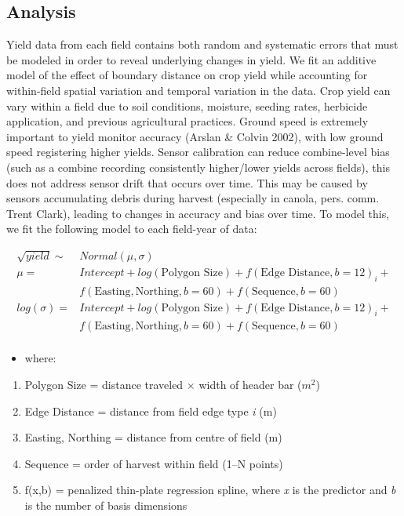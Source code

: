 \documentclass[]{elsarticle} %
\providecommand{\tightlist}{%
  \setlength{\itemsep}{0pt}\setlength{\parskip}{0pt}}
\begin{document}
\hypertarget{analysis}{%
\subsection{Analysis}\label{analysis}}

Yield data from each field contains both random and systematic errors that must be modeled in order to reveal underlying changes in yield.
We fit an additive model of the effect of boundary distance on crop yield while accounting for within-field spatial variation and temporal variation in the data.
Crop yield can vary within a field due to soil conditions, moisture, seeding rates, herbicide application, and previous agricultural practices.
Ground speed is extremely important to yield monitor accuracy (Arslan \& Colvin 2002), with low ground speed registering higher yields.
Sensor calibration can reduce combine-level bias (such as a combine recording consistently higher/lower yields across fields), this does not address sensor drift that occurs over time.
This may be caused by sensors accumulating debris during harvest (especially in canola, pers. comm. Trent Clark), leading to changes in accuracy and bias over time.
To model this, we fit the following model to each field-year of data:

\begin{equation}
  \begin{split}
  \sqrt{yield} \sim & Normal (\mu, \sigma)\\
  \mu = & Intercept + log(\text{Polygon Size}) + f(\text{Edge Distance}, b=12)_i + \\
   & f(\text{Easting}, \text{Northing}, b=60) + f(\text{Sequence}, b=60) \\
  log(\sigma) =  & Intercept + log(\text{Polygon Size}) + f(\text{Edge Distance}, b=12)_i + \\
   & f(\text{Easting}, \text{Northing}, b=60) + f(\text{Sequence}, b=60) \\
  \end{split}
  \end{equation}

\begin{itemize}
\tightlist
\item
  where:
\end{itemize}

\begin{enumerate}
\def\labelenumi{\arabic{enumi}.}
\tightlist
\item
  Polygon Size = distance traveled \(\times\) width of header bar (\(m^2\))
\item
  Edge Distance = distance from field edge type \emph{i} (m)
\item
  Easting, Northing = distance from centre of field (m)
\item
  Sequence = order of harvest within field (1--N points)
\item
  f(x,b) = penalized thin-plate regression spline, where \emph{x} is the predictor and \emph{b} is the number of basis dimensions
\end{enumerate}
\end{document}

